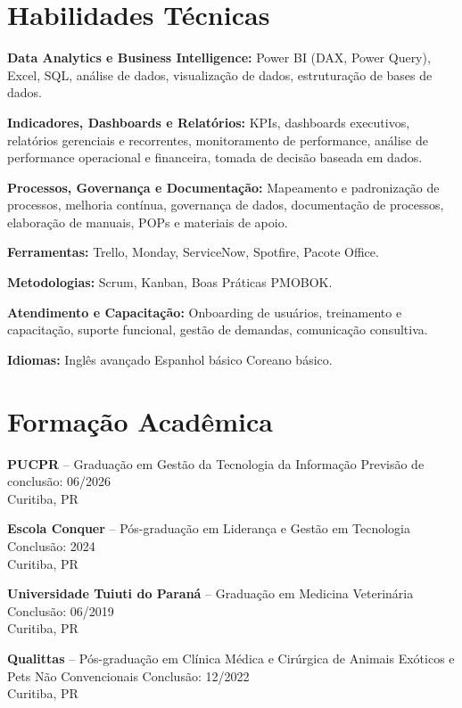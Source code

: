 \documentclass[11pt,a4paper]{article}
\begin{document}
\section*{Habilidades Técnicas}

\textbf{Data Analytics e Business Intelligence:} Power BI (DAX, Power Query), Excel, SQL, análise de dados, visualização de dados, estruturação de bases de dados.

\textbf{Indicadores, Dashboards e Relatórios:} KPIs, dashboards executivos, relatórios gerenciais e recorrentes, monitoramento de performance, análise de performance operacional e financeira, tomada de decisão baseada em dados.

\textbf{Processos, Governança e Documentação:} Mapeamento e padronização de processos, melhoria contínua, governança de dados, documentação de processos, elaboração de manuais, POPs e materiais de apoio.

\textbf{Ferramentas:} Trello, Monday, ServiceNow, Spotfire, Pacote Office.

\textbf{Metodologias:} Scrum, Kanban, Boas Práticas PMOBOK.

\textbf{Atendimento e Capacitação:} Onboarding de usuários, treinamento e capacitação, suporte funcional, gestão de demandas, comunicação consultiva.

\textbf{Idiomas:} Inglês avançado \textbullet{} Espanhol básico \textbullet{} Coreano básico.

\section*{Formação Acadêmica}

\textbf{PUCPR} -- Graduação em Gestão da Tecnologia da Informação \hfill Previsão de conclusão: 06/2026\\
Curitiba, PR

\textbf{Escola Conquer} -- Pós-graduação em Liderança e Gestão em Tecnologia \hfill Conclusão: 2024\\
Curitiba, PR

\textbf{Universidade Tuiuti do Paraná} -- Graduação em Medicina Veterinária \hfill Conclusão: 06/2019\\
Curitiba, PR

\textbf{Qualittas} -- Pós-graduação em Clínica Médica e Cirúrgica de Animais Exóticos e Pets Não Convencionais \hfill Conclusão: 12/2022\\
Curitiba, PR
\end{document}
